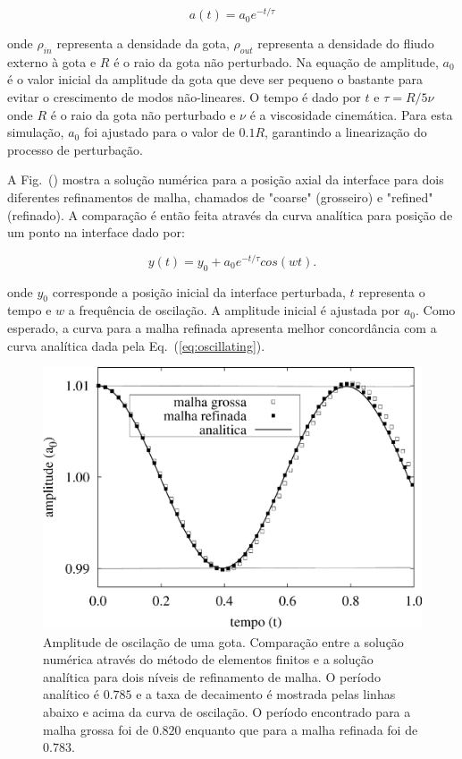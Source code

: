 \documentclass[a4paper,portuges,12pt]{article}
\begin{document}
\begin{equation}
	a(t) = a_0 e^{-t/\tau}
\label{eq:amplitude}
\end{equation}

\noindent onde $\rho_{in}$ representa a densidade da gota, $\rho_{out}$
representa a densidade do fliudo externo à gota e $R$ é o raio da gota
não perturbado. Na equação de amplitude, $a_0$ é o valor inicial da
amplitude da gota que deve ser pequeno o bastante para evitar o
crescimento de modos não-lineares. O tempo é dado por $t$ e $\tau=R/5\nu$
onde $R$ é o raio da gota não perturbado e $\nu$ é a viscosidade
cinemática. Para esta simulação, $a_0$ foi ajustado para o valor de
$0.1R$, garantindo a linearização do processo de perturbação. 

A Fig.~(\label{fig:oscillating}) mostra a solução numérica para a
posição axial da interface para dois diferentes refinamentos de malha,
chamados de "coarse" (grosseiro) e "refined" (refinado). A comparação é
então feita através da curva analítica para posição de um ponto na
interface dado por:

\begin{equation}
	y(t) = y_0 + a_0 e^{-t/\tau} cos(wt).
\label{eq:oscillating}
\end{equation}

\noindent onde $y_0$ corresponde a posição inicial da interface
perturbada, $t$ representa o tempo e $w$ a frequência de oscilação. A
amplitude inicial é ajustada por $a_0$. Como esperado, a curva para a
malha refinada apresenta melhor concordância com a curva analítica dada
pela Eq.~(\ref{eq:oscillating}).

 \begin{figure}[h!]
 	\begin{center}
 		\includegraphics[angle=0, scale=0.5]{figs/oscillating.pdf}
 	\end{center}
	\caption{Amplitude de oscilação de uma gota. Comparação entre a
	solução numérica através do método de elementos finitos e a solução
	analítica para dois níveis de refinamento de malha. O período
	analítico é $0.785$ e a taxa de decaimento é mostrada pelas linhas
	abaixo e acima da curva de oscilação. O período encontrado para a
	malha grossa foi de $0.820$ enquanto que para a malha refinada foi
	de $0.783$.}
 	\label{fig:oscillating} 
 \end{figure}
\end{document}
